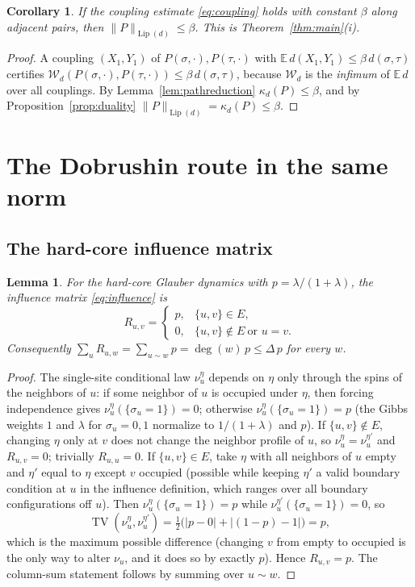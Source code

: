 \documentclass{amsart}
\newtheorem{lemma}{Lemma}
\newtheorem{corollary}{Corollary}
\DeclareMathOperator{\Lip}{Lip}
\DeclareMathOperator{\TV}{TV}
\newcommand{\E}{\mathbb{E}}
\newcommand{\Wd}{\mathcal{W}_d}
\begin{document}
\begin{corollary}\label{cor:i}
If the coupling estimate \eqref{eq:coupling} holds with constant $\beta$ along
adjacent pairs, then $\|P\|_{\Lip(d)}\le\beta$. This is
Theorem~\ref{thm:main}(i).
\end{corollary}
\begin{proof}
A coupling $(X_1,Y_1)$ of $P(\sigma,\cdot),P(\tau,\cdot)$ with
$\E\,d(X_1,Y_1)\le\beta\,d(\sigma,\tau)$ certifies
$\Wd(P(\sigma,\cdot),P(\tau,\cdot))\le\beta\,d(\sigma,\tau)$, because $\Wd$ is the
\emph{infimum} of $\E\,d$ over all couplings. By Lemma~\ref{lem:pathreduction}
$\kappa_d(P)\le\beta$, and by Proposition~\ref{prop:duality}
$\|P\|_{\Lip(d)}=\kappa_d(P)\le\beta$.
\end{proof}

\section{The Dobrushin route in the same norm}

\subsection{The hard-core influence matrix}
\begin{lemma}\label{lem:hardcore}
For the hard-core Glauber dynamics with $p=\lambda/(1+\lambda)$, the influence
matrix \eqref{eq:influence} is
\[
R_{u,v}=
\begin{cases}
p, & \{u,v\}\in E,\\
0, & \{u,v\}\notin E\ \text{or }u=v .
\end{cases}
\]
Consequently $\sum_{u} R_{u,w}=\sum_{u\sim w} p=\deg(w)\,p\le\Delta\,p$ for every
$w$.
\end{lemma}
\begin{proof}
The single-site conditional law $\nu_u^{\eta}$ depends on $\eta$ only through the
spins of the neighbors of $u$: if some neighbor of $u$ is occupied under $\eta$,
then forcing independence gives $\nu_u^{\eta}(\{\sigma_u=1\})=0$; otherwise
$\nu_u^{\eta}(\{\sigma_u=1\})=p$ (the Gibbs weights $1$ and $\lambda$ for
$\sigma_u=0,1$ normalize to $1/(1+\lambda)$ and $p$). If
$\{u,v\}\notin E$, changing $\eta$ only at $v$ does not change the neighbor
profile of $u$, so $\nu_u^{\eta}=\nu_u^{\eta'}$ and $R_{u,v}=0$; trivially
$R_{u,u}=0$. If $\{u,v\}\in E$, take $\eta$ with all neighbors of $u$ empty and
$\eta'$ equal to $\eta$ except $v$ occupied (possible while keeping $\eta'$ a
valid boundary condition at $u$ in the influence definition, which ranges over
all boundary configurations off $u$). Then
$\nu_u^{\eta}(\{\sigma_u=1\})=p$ while $\nu_u^{\eta'}(\{\sigma_u=1\})=0$, so
\[
\TV(\nu_u^{\eta},\nu_u^{\eta'})
=\tfrac12\big(|p-0|+|(1-p)-1|\big)=p,
\]
which is the maximum possible difference (changing $v$ from empty to occupied is
the only way to alter $\nu_u$, and it does so by exactly $p$). Hence
$R_{u,v}=p$. The column-sum statement follows by summing over $u\sim w$.
\end{proof}
\end{document}

